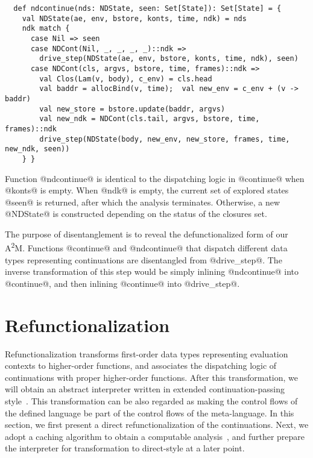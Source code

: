 \documentclass[acmsmall, screen]{acmart}\settopmatter{}
\begin{document}
\begin{lstlisting}
  def ndcontinue(nds: NDState, seen: Set[State]): Set[State] = {
    val NDState(ae, env, bstore, konts, time, ndk) = nds
    ndk match {
      case Nil => seen
      case NDCont(Nil, _, _, _, _)::ndk =>
        drive_step(NDState(ae, env, bstore, konts, time, ndk), seen)
      case NDCont(cls, argvs, bstore, time, frames)::ndk =>
        val Clos(Lam(v, body), c_env) = cls.head
        val baddr = allocBind(v, time);  val new_env = c_env + (v -> baddr)
        val new_store = bstore.update(baddr, argvs)
        val new_ndk = NDCont(cls.tail, argvs, bstore, time, frames)::ndk
        drive_step(NDState(body, new_env, new_store, frames, time, new_ndk, seen))
    } }
\end{lstlisting}

Function @ndcontinue@ is identical to the dispatching logic in @continue@ when @konts@ is empty.
When @ndk@ is empty, the current set of explored states @seen@ is returned, after which the analysis terminates.
Otherwise, a new @NDState@ is constructed depending on the status of the closures set.

The purpose of disentanglement is to reveal the defunctionalized form of our A\textsuperscript{2}M.
Functions @continue@ and @ndcontinue@ that dispatch different data types representing
continuations are disentangled from @drive_step@.
The inverse transformation of this step would be simply inlining @ndcontinue@ into @continue@,
and then inlining @continue@ into @drive_step@.

\section{Refunctionalization} \label{sec:refunc}

Refunctionalization transforms first-order data types representing evaluation contexts
to higher-order functions, and associates the dispatching logic of continuations with
proper higher-order functions.
After this transformation, we will obtain an abstract interpreter written in extended
continuation-passing style~\cite{Danvy:1990:AC:91556.91622}.
This transformation can be also regarded as making the control flows of the defined
language be part of the control flows of the meta-language.
In this section, we first present a direct refunctionalization of the continuations.
Next, we adopt a caching algorithm to obtain a computable analysis~\cite{darais2017abstracting},
and further prepare the interpreter for transformation to direct-style at a later point.
\end{document}
